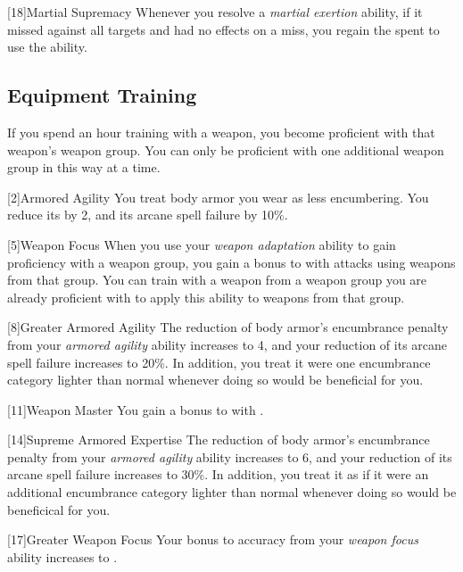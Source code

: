             [18]{Martial Supremacy}
            Whenever you resolve a \textit{martial exertion} ability, if it missed against all targets and had no effects on a miss, you regain the  spent to use the ability.

        \subsection{Equipment Training}
            If you spend an hour training with a weapon, you become proficient with that weapon's weapon group.
            You can only be proficient with one additional weapon group in this way at a time.

            [2]{Armored Agility}
            You treat body armor you wear as less encumbering.
            You reduce its  by 2, and its arcane spell failure by 10\%.

            [5]{Weapon Focus} 
            When you use your \textit{weapon adaptation} ability to gain proficiency with a weapon group, you gain a  bonus to  with attacks using weapons from that group.
            You can train with a weapon from a weapon group you are already proficient with to apply this ability to weapons from that group.

            [8]{Greater Armored Agility}
            The reduction of body armor's encumbrance penalty from your \textit{armored agility} ability increases to 4, and your reduction of its arcane spell failure increases to 20\%.
            In addition, you treat it were one encumbrance category lighter than normal whenever doing so would be beneficial for you.

            [11]{Weapon Master} 
            You gain a  bonus to  with .

            [14]{Supreme Armored Expertise}
            The reduction of body armor's encumbrance penalty from your \textit{armored agility} ability increases to 6, and your reduction of its arcane spell failure increases to 30\%.
            In addition, you treat it as if it were an additional encumbrance category lighter than normal whenever doing so would be beneficical for you.

            [17]{Greater Weapon Focus} 
            Your bonus to accuracy from your \textit{weapon focus} ability increases to .

